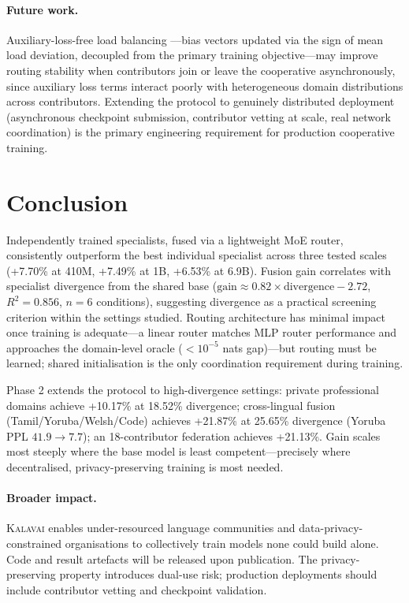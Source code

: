 \documentclass{article}
\newcommand{\kalavai}{\textsc{Kalavai}\xspace}
\begin{document}
\paragraph{Future work.} Auxiliary-loss-free load balancing \citep{liu2024deepseekv3}---bias vectors updated via the sign of mean load deviation, decoupled from the primary training objective---may improve routing stability when contributors join or leave the cooperative asynchronously, since auxiliary loss terms interact poorly with heterogeneous domain distributions across contributors. Extending the protocol to genuinely distributed deployment (asynchronous checkpoint submission, contributor vetting at scale, real network coordination) is the primary engineering requirement for production cooperative training.

\section{Conclusion}
\label{sec:conclusion}

Independently trained specialists, fused via a lightweight MoE router, consistently outperform the best individual specialist across three tested scales (+7.70\% at 410M, +7.49\% at 1B, +6.53\% at 6.9B). Fusion gain correlates with specialist divergence from the shared base ($\text{gain} \approx 0.82 \times \text{divergence} - 2.72$, $R^2 = 0.856$, $n{=}6$ conditions), suggesting divergence as a practical screening criterion within the settings studied. Routing architecture has minimal impact once training is adequate---a linear router matches MLP router performance and approaches the domain-level oracle ($<10^{-5}$ nats gap)---but routing must be learned; shared initialisation is the only coordination requirement during training.

Phase 2 extends the protocol to high-divergence settings: private professional domains achieve +10.17\% at 18.52\% divergence; cross-lingual fusion (Tamil/Yoruba/Welsh/Code) achieves +21.87\% at 25.65\% divergence (Yoruba PPL $41.9\to7.7$); an 18-contributor federation achieves +21.13\%. Gain scales most steeply where the base model is least competent---precisely where decentralised, privacy-preserving training is most needed.

\paragraph{Broader impact.} \kalavai enables under-resourced language communities and data-privacy-constrained organisations to collectively train models none could build alone. Code and result artefacts will be released upon publication. The privacy-preserving property introduces dual-use risk; production deployments should include contributor vetting and checkpoint validation.
\end{document}
